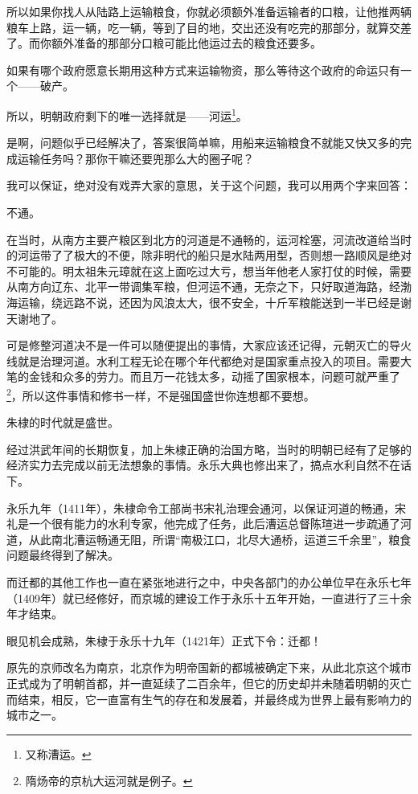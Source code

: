 \begin{multicols}{\theparacolNo}
所以如果你找人从陆路上运输粮食，你就必须额外准备运输者的口粮，让他推两辆粮车上路，运一辆，吃一辆，等到了目的地，交出还没有吃完的那部分，就算交差了。而你额外准备的那部分口粮可能比他运过去的粮食还要多。

如果有哪个政府愿意长期用这种方式来运输物资，那么等待这个政府的命运只有一个——破产。

所以，明朝政府剩下的唯一选择就是——河运\footnote{又称漕运。}。

是啊，问题似乎已经解决了，答案很简单嘛，用船来运输粮食不就能又快又多的完成运输任务吗？那你干嘛还要兜那么大的圈子呢？

我可以保证，绝对没有戏弄大家的意思，关于这个问题，我可以用两个字来回答：

不通。

在当时，从南方主要产粮区到北方的河道是不通畅的，运河栓塞，河流改道给当时的河运带了了极大的不便，除非明代的船只是水陆两用型，否则想一路顺风是绝对不可能的。明太祖朱元璋就在这上面吃过大亏，想当年他老人家打仗的时候，需要从南方向辽东、北平一带调集军粮，但河运不通，无奈之下，只好取道海路，经渤海运输，绕远路不说，还因为风浪太大，很不安全，十斤军粮能送到一半已经是谢天谢地了。

可是修整河道决不是一件可以随便提出的事情，大家应该还记得，元朝灭亡的导火线就是治理河道。水利工程无论在哪个年代都绝对是国家重点投入的项目。需要大笔的金钱和众多的劳力。而且万一花钱太多，动摇了国家根本，问题可就严重了\footnote{隋炀帝的京杭大运河就是例子。}，所以这件事情和修书一样，不是强国盛世你连想都不要想。

朱棣的时代就是盛世。

经过洪武年间的长期恢复，加上朱棣正确的治国方略，当时的明朝已经有了足够的经济实力去完成以前无法想象的事情。永乐大典也修出来了，搞点水利自然不在话下。

永乐九年（1411年），朱棣命令工部尚书宋礼治理会通河，以保证河道的畅通，宋礼是一个很有能力的水利专家，他完成了任务，此后漕运总督陈瑄进一步疏通了河道，从此南北漕运畅通无阻，所谓“南极江口，北尽大通桥，运道三千余里”，粮食问题最终得到了解决。

而迁都的其他工作也一直在紧张地进行之中，中央各部门的办公单位早在永乐七年（1409年）就已经修好，而京城的建设工作于永乐十五年开始，一直进行了三十余年才结束。

眼见机会成熟，朱棣于永乐十九年（1421年）正式下令：迁都！

原先的京师改名为南京，北京作为明帝国新的都城被确定下来，从此北京这个城市正式成为了明朝首都，并一直延续了二百余年，但它的历史却并未随着明朝的灭亡而结束，相反，它一直富有生气的存在和发展着，并最终成为世界上最有影响力的城市之一。


\end{multicols}
